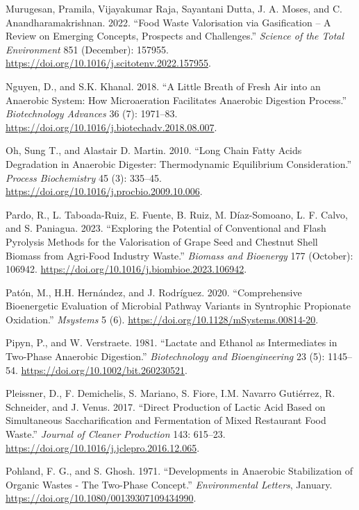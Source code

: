 \documentclass[11pt]{report}
\begin{document}
\begin{hangparas}{1.5em}{1}
\hypertarget{citeproc_bib_item_48}{Murugesan, Pramila, Vijayakumar Raja, Sayantani Dutta, J. A. Moses, and C. Anandharamakrishnan. 2022. “Food Waste Valorisation via Gasification – A Review on Emerging Concepts, Prospects and Challenges.” \textit{Science of the Total Environment} 851 (December): 157955. \url{https://doi.org/10.1016/j.scitotenv.2022.157955}.}

\hypertarget{citeproc_bib_item_49}{Nguyen, D., and S.K. Khanal. 2018. “A Little Breath of Fresh Air into an Anaerobic System: How Microaeration Facilitates Anaerobic Digestion Process.” \textit{Biotechnology Advances} 36 (7): 1971–83. \url{https://doi.org/10.1016/j.biotechadv.2018.08.007}.}

\hypertarget{citeproc_bib_item_50}{Oh, Sung T., and Alastair D. Martin. 2010. “Long Chain Fatty Acids Degradation in Anaerobic Digester: Thermodynamic Equilibrium Consideration.” \textit{Process Biochemistry} 45 (3): 335–45. \url{https://doi.org/10.1016/j.procbio.2009.10.006}.}

\hypertarget{citeproc_bib_item_51}{Pardo, R., L. Taboada-Ruiz, E. Fuente, B. Ruiz, M. Díaz-Somoano, L. F. Calvo, and S. Paniagua. 2023. “Exploring the Potential of Conventional and Flash Pyrolysis Methods for the Valorisation of Grape Seed and Chestnut Shell Biomass from Agri-Food Industry Waste.” \textit{Biomass and Bioenergy} 177 (October): 106942. \url{https://doi.org/10.1016/j.biombioe.2023.106942}.}

\hypertarget{citeproc_bib_item_52}{Patón, M., H.H. Hernández, and J. Rodríguez. 2020. “Comprehensive Bioenergetic Evaluation of Microbial Pathway Variants in Syntrophic Propionate Oxidation.” \textit{Msystems} 5 (6). \url{https://doi.org/10.1128/mSystems.00814-20}.}

\hypertarget{citeproc_bib_item_53}{Pipyn, P., and W. Verstraete. 1981. “Lactate and Ethanol as Intermediates in Two-Phase Anaerobic Digestion.” \textit{Biotechnology and Bioengineering} 23 (5): 1145–54. \url{https://doi.org/10.1002/bit.260230521}.}

\hypertarget{citeproc_bib_item_54}{Pleissner, D., F. Demichelis, S. Mariano, S. Fiore, I.M. Navarro Gutiérrez, R. Schneider, and J. Venus. 2017. “Direct Production of Lactic Acid Based on Simultaneous Saccharification and Fermentation of Mixed Restaurant Food Waste.” \textit{Journal of Cleaner Production} 143: 615–23. \url{https://doi.org/10.1016/j.jclepro.2016.12.065}.}

\hypertarget{citeproc_bib_item_55}{Pohland, F. G., and S. Ghosh. 1971. “Developments in Anaerobic Stabilization of Organic Wastes - The Two-Phase Concept.” \textit{Environmental Letters}, January. \url{https://doi.org/10.1080/00139307109434990}.}


\end{hangparas}
\end{document}
